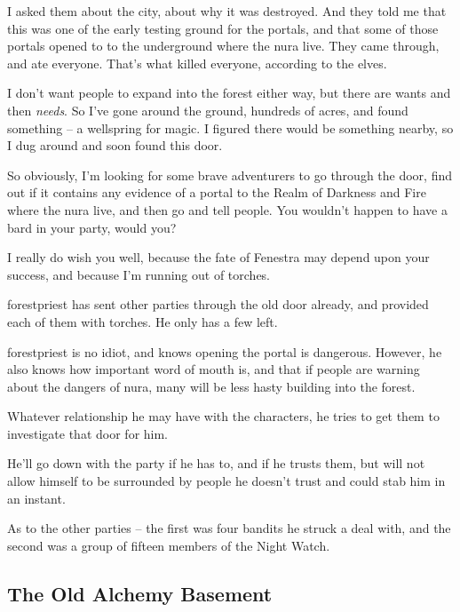 \begin{multicols}{2}
\begin{speechtext}
	I asked them about the city, about why it was destroyed.
	And they told me that this was one of the early testing ground for the portals, and that some of those portals opened to to the underground where the nura live.
	They came through, and ate everyone.
	That's what killed everyone, according to the elves.

	I don't want people to expand into the forest either way, but there are wants and then \emph{needs}.  So I've gone around the ground, hundreds of acres, and found something -- a wellspring for magic.  I figured there would be something nearby, so I dug around and soon found this door.

	So obviously, I'm looking for some brave adventurers to go through the door, find out if it contains any evidence of a portal to the Realm of Darkness and Fire where the nura live, and then go and tell people.
	You wouldn't happen to have a bard in your party, would you?

	I really do wish you well, because the fate of Fenestra may depend upon your success, and because I'm running out of torches.

\end{speechtext}

\Gls{forestpriest} has sent other parties through the old door already, and provided each of them with torches.
He only has a few left.

\Gls{forestpriest} is no idiot, and knows opening the portal is dangerous.
However, he also knows how important word of mouth is, and that if people are warning about the dangers of nura, many will be less hasty building into the forest.

Whatever relationship he may have with the characters, he tries to get them to investigate that door for him.

He'll go down with the party if he has to, and if he trusts them, but will not allow himself to be surrounded by people he doesn't trust and could stab him in an instant.

As to the other parties -- the first was four bandits he struck a deal with, and the second was a group of fifteen members of the Night Watch.

\forestpriest

\subsection{The Old Alchemy Basement}\label{old_alchemy_basement}\setcounter{list}{0}


\end{multicols}
